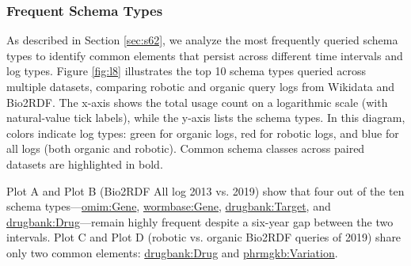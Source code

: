 \documentclass[sw]{iosart2x}
\begin{document}


\subsubsection{Frequent Schema Types}
As described in Section \ref{sec:s62}, we analyze the most frequently queried schema types to identify common elements that persist across different time intervals and log types. Figure \ref{fig:l8} illustrates the top 10 schema types queried across multiple datasets, comparing robotic and organic query logs from Wikidata and Bio2RDF. The x-axis shows the total usage count on a logarithmic scale (with natural-value tick labels), while the y-axis lists the schema types. In this diagram, colors indicate log types: green for organic logs, red for robotic logs, and blue for all logs (both organic and robotic). Common schema classes across paired datasets are highlighted in bold.


Plot A and Plot B (Bio2RDF All log 2013 vs. 2019) show that four out of the ten schema types—\href{http://bio2rdf.org/omim:Gene}{omim:Gene}, \href{http://bio2rdf.org/wormbase:Gene}{wormbase:Gene}, \href{http://bio2rdf.org/drugbank:Target}{drugbank:Target}, and \href{http://bio2rdf.org/drugbank:Drug}{drugbank:Drug}—remain highly frequent despite a six-year gap between the two intervals. Plot C and Plot D (robotic vs. organic Bio2RDF queries of 2019) share only two common elements: \href{http://bio2rdf.org/drugbank:Drug}{drugbank:Drug} and \href{http://bio2rdf.org/phrmgkb:Variation}{phrmgkb:Variation}.
\end{document}
